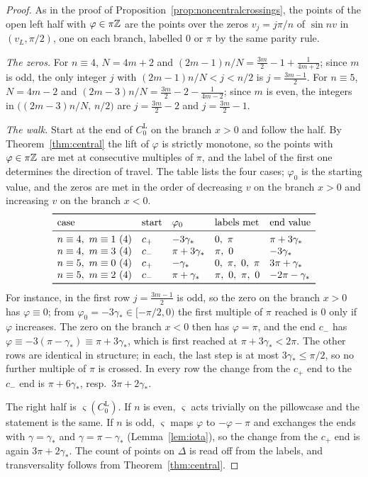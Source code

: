 \begin{proof}
As in the proof of Proposition~\ref{prop:noncentralcrossings}, the points of the open left half with $\varphi\in\pi\mathbb{Z}$ are the points
over the zeros $v_j=j\pi/n$ of $\sin nv$ in $(v_L,\pi/2)$, one on each branch, labelled $0$ or $\pi$ by the same parity rule.

\emph{The zeros.} For $n\equiv4$, $N=4m+2$ and $(2m-1)n/N=\frac{3m}2-1+\frac{1}{4m+2}$; since $m$ is odd, the only integer $j$
with $(2m-1)n/N<j<n/2$ is $j=\frac{3m-1}2$. For $n\equiv5$, $N=4m-2$ and $(2m-3)n/N=\frac{3m}2-2-\frac1{4m-2}$; since $m$ is even,
the integers in $\bigl((2m-3)n/N,\,n/2\bigr)$ are $j=\frac{3m}2-2$ and $j=\frac{3m}2-1$.

\emph{The walk.} Start at the end of $C_0^{\mathrm L}$ on the branch $x>0$ and follow the half. By
Theorem~\ref{thm:central} the lift of $\varphi$ is strictly monotone, so the points with $\varphi\in\pi\mathbb{Z}$ are met at consecutive
multiples of $\pi$, and the label of the first one determines the direction of travel. The table lists the four
cases; $\varphi_0$ is the starting value, and the zeros are met in the order of decreasing $v$ on the branch $x>0$ and
increasing $v$ on the branch $x<0$.
\[
\begin{array}{lllll}
\toprule
\text{case} & \text{start} & \varphi_0 & \text{labels met} & \text{end value}\\ \midrule
n\equiv4,\ m\equiv1\ (4) & c_+ & -3\gamma_* & 0,\ \pi & \pi+3\gamma_*\\
n\equiv4,\ m\equiv3\ (4) & c_- & \pi+3\gamma_* & \pi,\ 0 & -3\gamma_*\\
n\equiv5,\ m\equiv0\ (4) & c_+ & -\gamma_* & 0,\ \pi,\ 0,\ \pi & 3\pi+\gamma_*\\
n\equiv5,\ m\equiv2\ (4) & c_- & \pi+\gamma_* & \pi,\ 0,\ \pi,\ 0 & -2\pi-\gamma_*\\ \bottomrule
\end{array}
\]
For instance, in the first row $j=\frac{3m-1}2$ is odd, so the zero on the branch $x>0$ has $\varphi\equiv0$; from
$\varphi_0=-3\gamma_*\in[-\pi/2,0)$ the first multiple of $\pi$ reached is $0$ only if $\varphi$ increases. The zero on the branch $x<0$
then has $\varphi=\pi$, and the end $c_-$ has $\varphi\equiv-3(\pi-\gamma_*)\equiv\pi+3\gamma_*$, which is first reached at $\pi+3\gamma_*<2\pi$.
The other rows are identical in structure; in each, the last step is at most $3\gamma_*\le\pi/2$, so no further multiple
of $\pi$ is crossed. In every row the change from the $c_+$ end to the $c_-$ end is $\pi+6\gamma_*$, resp.\ $3\pi+2\gamma_*$.

The right half is $\varsigma(C_0^{\mathrm L})$. If $n$ is even, $\varsigma$ acts trivially on the pillowcase and the statement is the
same. If $n$ is odd, $\varsigma$ maps $\varphi$ to $-\varphi-\pi$ and exchanges the ends with $\gamma=\gamma_*$ and $\gamma=\pi-\gamma_*$
(Lemma~\ref{lem:iota}), so the change from the $c_+$ end is again $3\pi+2\gamma_*$. The count of points on $\Delta$ is read off from
the labels, and transversality follows from Theorem~\ref{thm:central}.
\end{proof}

